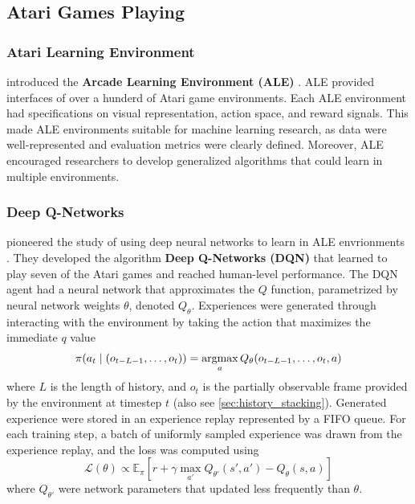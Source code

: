 \subsection{Atari Games Playing}
\subsubsection{Atari Learning Environment}
\citeauthor{ArcadeLearningEnvironment_Bellemare.Naddaf.ea_2013a} introduced the \textbf{Arcade Learning Environment (ALE)} \cite{ArcadeLearningEnvironment_Bellemare.Naddaf.ea_2013a}.
ALE provided interfaces of over a hunderd of Atari game environments.
Each ALE environment had specifications on visual representation, action space, and reward signals.
This made ALE environments suitable for machine learning research,
as data were well-represented and evaluation metrics were clearly defined.
Moreover, ALE encouraged researchers to develop generalized algorithms that could learn in multiple environments.

\subsubsection{Deep Q-Networks}
\citeauthor{PlayingAtariDeep_Mnih.Kavukcuoglu.ea_2013} pioneered the study of using deep neural networks to learn in ALE envrionments \cite{PlayingAtariDeep_Mnih.Kavukcuoglu.ea_2013}.
They developed the algorithm \textbf{Deep Q-Networks (DQN)} that learned to play seven of the Atari games and reached human-level performance.
The DQN agent had a neural network that approximates the $Q$ function, parametrized by neural network weights $\theta$, denoted $Q_\theta$.
Experiences were generated through interacting with the environment by taking the action that maximizes the immediate $q$ value
\begin{align*}
    \pi(a_t \mid (o_{t - L - 1}, \dots, o_t)) = \operatorname*{argmax}_{a}{Q_{\theta}(o_{t - L - 1}, \dots, o_t, a)}
\end{align*}
where $L$ is the length of history, and $o_t$ is the partially observable frame provided by the environment at timestep $t$ (also see \ref{sec:history_stacking}).
Generated experience were stored in an experience replay represented by a FIFO queue.
For each training step, a batch of uniformly sampled experience was drawn from the experience replay, and the loss was computed using
\begin{equation*}
    \mathcal{L}(\theta) \propto \mathbb{E}_\pi\left[r + \gamma \max _{a'} Q_{\theta'}(s', a') - Q_{\theta}(s, a) \right]
\end{equation*}
where $Q_{\theta'}$ were network parameters that updated less frequently than $\theta$.

